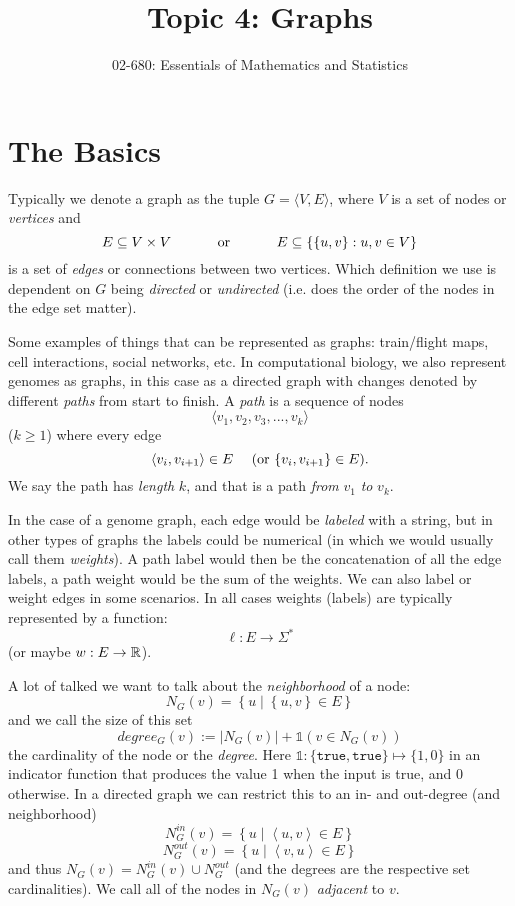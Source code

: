 


\title{Topic 4: Graphs}
\author{02-680: Essentials of Mathematics and Statistics}


\maketitle

\section{The Basics}
Typically we denote a graph as the tuple $G=\langle V, E\rangle$, 
where $V$ is a set of nodes or \emph{vertices} and 
\[E\subseteq V\times V \textnormal{\hspace{3em} or \hspace{3em}} E\subseteq \left\{\left\{u,v\right\} : u,v \in V\right\}\] 
is a set of \emph{edges} or connections between two vertices.
Which definition we use is dependent on $G$ being \emph{directed} or \emph{undirected} (i.e. does the order of the nodes in the edge set matter).  

Some examples of things that can be represented as graphs: train/flight maps, cell interactions, social networks, etc. 
In computational biology, we also represent genomes as graphs, in this case as a directed graph with changes denoted by different \emph{paths} from start to finish. 
A \textit{path} is a sequence of nodes \[\langle v_1, v_2, v_3,...,v_k \rangle\] ($k\ge 1$) where every edge \[\langle v_{i}, v_{i+1}\rangle \in E\textnormal{\hspace{1em} (or  }\{ v_{i}, v_{i+1}\} \in E\textnormal{).}\]
We say the path has \emph{length} $k$, and that is a path \textit{from} $v_1$ \textit{to} $v_k$.

In the case of a genome graph, each edge would be \emph{labeled} with a string, but in other types of graphs the labels could be numerical 
(in which we would usually call them \textit{weights}).
A path label would then be the concatenation of all the edge labels, a path weight would be the sum of the weights. 
We can also label or weight edges in some scenarios. 
In all cases weights (labels) are typically represented by a function:
\[\ell: E \rightarrow \Sigma^* \]
(or maybe $w: E \rightarrow \operatorname{\mathbb{R}}$).

A lot of talked we want to talk about the \emph{neighborhood} of a node: 
\[N_G(v) = \left\{ u \mid \left\{u,v\right\} \in E\right\}\]
and we call the size of this set \[degree_G(v) := \left|N_G(v)\right| + \mathds{1}\left(v \in N_G\left(v\right)\right)\] the cardinality of the node or the \emph{degree}. 
Here $\mathds{1}: \{\texttt{true},\texttt{true}\}\mapsto\{1,0\}$ in an indicator function that produces the value 1 when the input is true, and 0 otherwise.  
In a directed graph we can restrict this to an in- and out-degree (and neighborhood)
\[N^{in}_G(v) = \left\{ u \mid \left\langle u,v\right\rangle \in E\right\}\]
\[N^{out}_G(v) = \left\{ u \mid \left\langle v,u\right\rangle \in E\right\}\]
and thus $N_G(v) = N^{in}_G(v) \cup N^{out}_G$ (and the degrees are the respective set cardinalities). 
We call all of the nodes in $N_G(v)$ \emph{adjacent} to $v$. 

